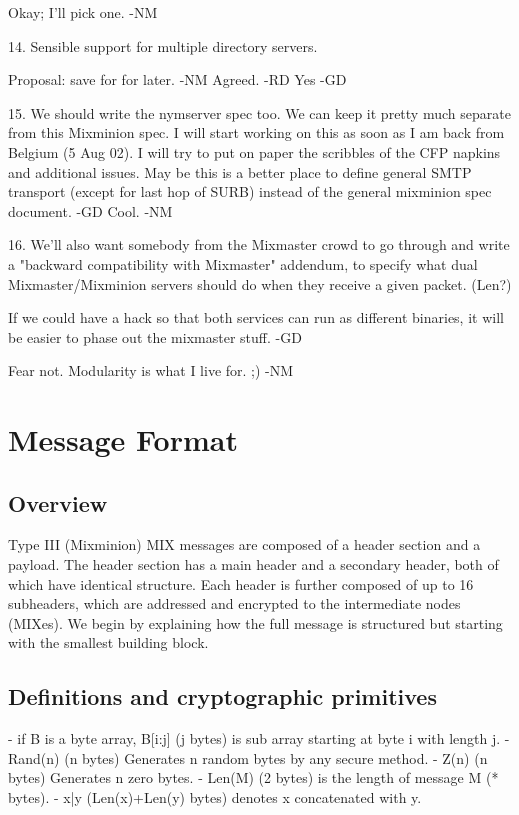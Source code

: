     Okay; I'll pick one. -NM

14. Sensible support for multiple directory servers.

    Proposal: save for for later. -NM
    Agreed. -RD
    Yes -GD

15. We should write the nymserver spec too. We can keep it pretty much
    separate from this Mixminion spec.
    I will start working on this as soon as I am back from Belgium (5
    Aug 02). I will try to put on paper the scribbles of the CFP
    napkins and additional issues. May be this is a better place to
    define general SMTP transport (except for last hop of SURB)
    instead of the general mixminion spec document. -GD
    Cool. -NM    

16. We'll also want somebody from the Mixmaster crowd to go through and
    write a "backward compatibility with Mixmaster" addendum, to specify
    what dual Mixmaster/Mixminion servers should do when they receive a
    given packet. (Len?)

    If we could have a hack so that both services can run as different
    binaries, it will be easier to phase out the mixmaster stuff. -GD

    Fear not.  Modularity is what I live for. ;) -NM

\section{Message Format}


\subsection{Overview}

Type III (Mixminion) MIX messages are composed of a header section and a
payload.  The header section has a main header and a
secondary header, both of which have identical structure.  Each
header is further composed of up to 16 subheaders, which are
addressed and encrypted to the intermediate nodes (MIXes).  We
begin by explaining how the full message is structured but starting
with the smallest building block.

\subsection{Definitions and cryptographic primitives}

- if B is a byte array, B[i:j] (j bytes) is sub array starting at 
  byte i with length j.
- Rand(n) (n bytes) Generates n random bytes by any secure method.
- Z(n) (n bytes) Generates n zero bytes.
- Len(M) (2 bytes) is the length of message M (* bytes).
- x|y (Len(x)+Len(y) bytes) denotes x concatenated with y.

